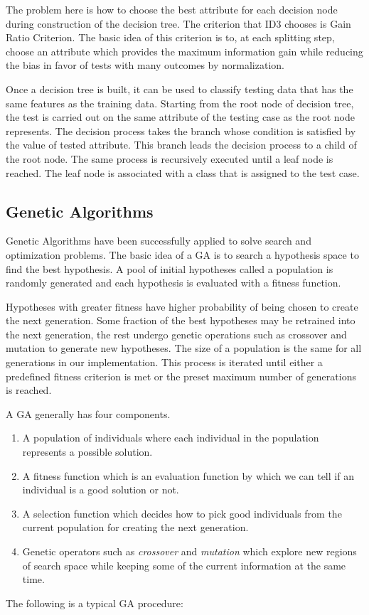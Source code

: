 \documentclass[conference]{IEEEtran}
\begin{document}
The problem here is how to choose the best attribute for each
decision node during construction of the decision tree. The
criterion that ID3 chooses is Gain Ratio Criterion. The basic idea
of this criterion is to, at each splitting step, choose an attribute
which provides the maximum information gain while reducing
the bias in favor of tests with many outcomes by normalization.



Once a decision tree is built, it can be used to classify testing data
that has the same features as the training data. Starting from the
root node of decision tree, the test is carried out on the same
attribute of the testing case as the root node represents. The
decision process takes the branch whose condition is satisfied by
the value of tested attribute. This branch leads the decision
process to a child of the root node. The same process is
recursively executed until a leaf node is reached. The leaf node is
associated with a class that is assigned to the test case.


\subsection{Genetic Algorithms}
Genetic Algorithms have been successfully applied to
solve search and optimization problems. The basic idea of a GA
is to search a hypothesis space to find the best hypothesis. A pool
of initial hypotheses called a population is randomly generated
and each hypothesis is evaluated with a fitness function.


Hypotheses with greater fitness have higher probability of being
chosen to create the next generation. Some fraction of the best
hypotheses may be retrained into the next generation, the rest
undergo genetic operations such as crossover and mutation to
generate new hypotheses. The size of a population is the same for
all generations in our implementation. This process is iterated
until either a predefined fitness criterion is met or the preset
maximum number of generations is reached.


A GA generally has four components. 

\begin{enumerate}
\item{A population of individuals where each individual in the population represents a possible solution.}
\item{A fitness function which is an evaluation function by which we can tell if an individual is a good solution or not.}
\item{A selection function which decides how to pick good
individuals from the current population for creating the next
generation.}
\item{Genetic operators such as \textit{crossover} and \textit{mutation}
which explore new regions of search space while keeping some of
the current information at the same time.}
\end{enumerate} 
The following is a typical GA procedure:
\end{document}
